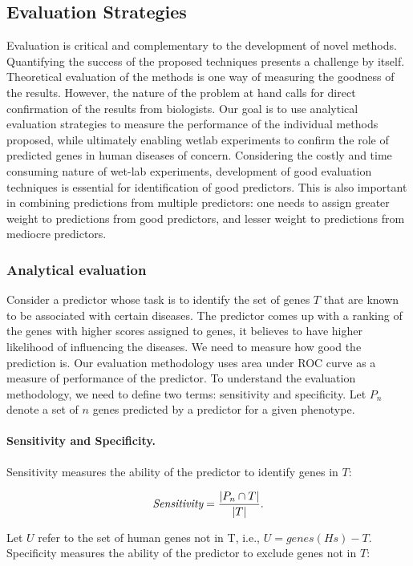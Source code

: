 \subsection{Evaluation Strategies}
\label{section:evaluation}
Evaluation is critical and complementary to the development of novel methods. Quantifying the success of the proposed techniques presents a challenge by itself. Theoretical evaluation of the methods is one way of measuring the goodness of the results. However, the nature of the problem at hand calls for direct confirmation of the results from biologists. Our goal is to use analytical evaluation strategies to measure the performance of the individual methods proposed, while ultimately enabling wetlab experiments to confirm the role of predicted genes in human diseases of concern. Considering the costly and time consuming nature of wet-lab experiments, development of good evaluation techniques is essential for identification of good predictors. This is also important in combining predictions from multiple predictors: one needs to assign greater weight to predictions from good predictors, and lesser weight to predictions from mediocre predictors.

\subsubsection{Analytical evaluation}
Consider a predictor whose task is to identify the set of genes $T$ that are known to be associated with certain diseases. The predictor comes up with a ranking of the genes with higher scores assigned to genes, it believes to have higher likelihood of influencing the diseases. We need to measure how good the prediction is. Our evaluation methodology uses area under ROC curve as a measure of performance of the predictor. To understand the evaluation methodology, we need to define two terms: sensitivity and specificity. Let $P_n$ denote a set of $n$ genes predicted by a predictor for a given phenotype.

\paragraph*{Sensitivity and Specificity.}
Sensitivity measures the ability of the predictor to identify genes in $T$:

$$\emph{Sensitivity} = \frac{|P_n \cap T|}{|T|}. $$

Let $U$ refer to the set of human genes not in T, i.e., $U = genes(Hs) - T$. Specificity measures the ability of the predictor to exclude genes not in $T$:

